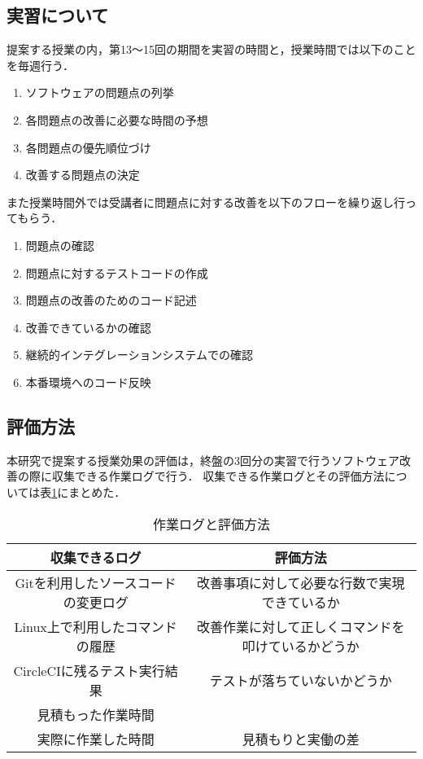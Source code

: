 \subsection{実習について}

提案する授業の内，第13〜15回の期間を実習の時間と，授業時間では以下のことを毎週行う．

\begin{enumerate}
\item ソフトウェアの問題点の列挙
\item 各問題点の改善に必要な時間の予想
\item 各問題点の優先順位づけ
\item 改善する問題点の決定
\end{enumerate}

また授業時間外では受講者に問題点に対する改善を以下のフローを繰り返し行ってもらう．

\begin{enumerate}
\item 問題点の確認
\item 問題点に対するテストコードの作成
\item 問題点の改善のためのコード記述
\item 改善できているかの確認
\item 継続的インテグレーションシステムでの確認
\item 本番環境へのコード反映
\end{enumerate}

\subsection{評価方法}

本研究で提案する授業効果の評価は，終盤の3回分の実習で行うソフトウェア改善の際に収集できる作業ログで行う．
収集できる作業ログとその評価方法については表\ref{tab:作業ログと評価方法}にまとめた．

\begin{table}[ht]
  \begin{center}
    \caption{作業ログと評価方法}
    \begin{tabular}{|c|c|}
      \hline
      収集できるログ & 評価方法 \\
      \hline
      Gitを利用したソースコードの変更ログ & 改善事項に対して必要な行数で実現できているか \\
      \hline
      Linux上で利用したコマンドの履歴 & 改善作業に対して正しくコマンドを叩けているかどうか \\
      \hline
      CircleCIに残るテスト実行結果 & テストが落ちていないかどうか \\
      \hline
      見積もった作業時間 & \\
      \cline{1-1}
      実際に作業した時間 & 見積もりと実働の差 \\
      \hline
    \end{tabular}
    \label{tab:作業ログと評価方法}
  \end{center}
\end{table}

